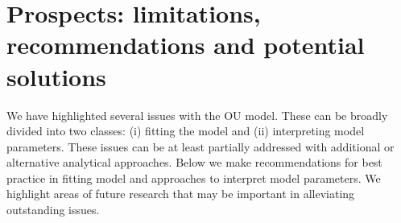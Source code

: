 \documentclass[a4paper,12pt]{article}
\begin{document}

\section{Prospects: limitations, recommendations and potential solutions}

  We have highlighted several issues with the OU model. These can be broadly divided into two classes: (i) fitting the model and (ii) interpreting model parameters. These issues can be at least partially addressed with additional or alternative analytical approaches. Below we make recommendations for best practice in fitting model and approaches to interpret model parameters. We highlight areas of future research that may be important in alleviating outstanding issues.
  
\end{document}
